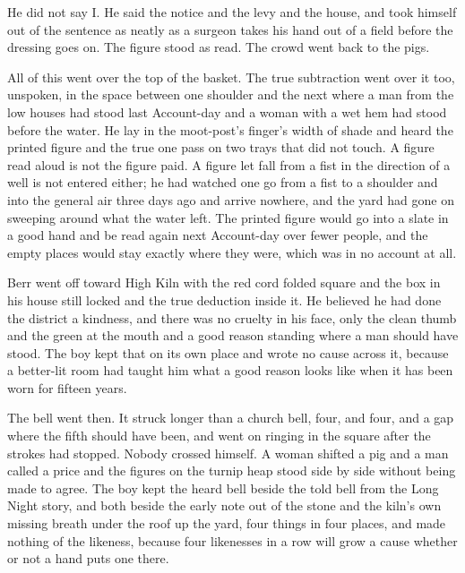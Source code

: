 He did not say I. He said the notice and the levy and the house, and took himself out of the sentence as neatly as a surgeon takes his hand out of a field before the dressing goes on. The figure stood as read. The crowd went back to the pigs.

All of this went over the top of the basket. The true subtraction went over it too, unspoken, in the space between one shoulder and the next where a man from the low houses had stood last Account-day and a woman with a wet hem had stood before the water. He lay in the moot-post's finger's width of shade and heard the printed figure and the true one pass on two trays that did not touch. A figure read aloud is not the figure paid. A figure let fall from a fist in the direction of a well is not entered either; he had watched one go from a fist to a shoulder and into the general air three days ago and arrive nowhere, and the yard had gone on sweeping around what the water left. The printed figure would go into a slate in a good hand and be read again next Account-day over fewer people, and the empty places would stay exactly where they were, which was in no account at all.

Berr went off toward High Kiln with the red cord folded square and the box in his house still locked and the true deduction inside it. He believed he had done the district a kindness, and there was no cruelty in his face, only the clean thumb and the green at the mouth and a good reason standing where a man should have stood. The boy kept that on its own place and wrote no cause across it, because a better-lit room had taught him what a good reason looks like when it has been worn for fifteen years.

The bell went then. It struck longer than a church bell, four, and four, and a gap where the fifth should have been, and went on ringing in the square after the strokes had stopped. Nobody crossed himself. A woman shifted a pig and a man called a price and the figures on the turnip heap stood side by side without being made to agree. The boy kept the heard bell beside the told bell from the Long Night story, and both beside the early note out of the stone and the kiln's own missing breath under the roof up the yard, four things in four places, and made nothing of the likeness, because four likenesses in a row will grow a cause whether or not a hand puts one there.
\scenebreak

